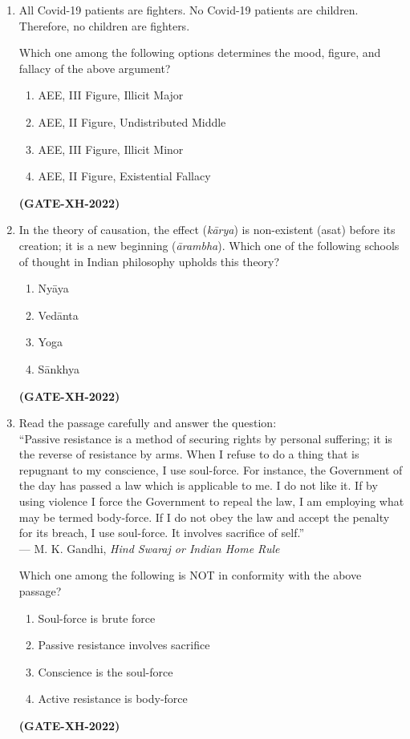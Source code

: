 \documentclass[journal]{IEEEtran}
\begin{document}
\begin{enumerate}
\item All Covid-19 patients are fighters. No Covid-19 patients are children. Therefore, no children are fighters.  

Which one among the following options determines the mood, figure, and fallacy of the above argument?  
\begin{multicols}{2}
\begin{enumerate}
\item AEE, III Figure, Illicit Major  
\item AEE, II Figure, Undistributed Middle  
\item AEE, III Figure, Illicit Minor  
\item AEE, II Figure, Existential Fallacy  
\end{enumerate}
\end{multicols}
\hfill\textbf{(GATE-XH-2022)}

\item In the theory of causation, the effect (\textit{kārya}) is non-existent (asat) before its creation; it is a new beginning (\textit{ārambha}). Which one of the following schools of thought in Indian philosophy upholds this theory?
\begin{multicols}{4}
\begin{enumerate}
\item Nyāya  
\item Vedānta  
\item Yoga  
\item Sānkhya  
\end{enumerate}
\end{multicols}
\hfill\textbf{(GATE-XH-2022)}

\item Read the passage carefully and answer the question:\\
“Passive resistance is a method of securing rights by personal suffering; it is the reverse of resistance by arms. When I refuse to do a thing that is repugnant to my conscience, I use soul-force. For instance, the Government of the day has passed a law which is applicable to me. I do not like it. If by using violence I force the Government to repeal the law, I am employing what may be termed body-force. If I do not obey the law and accept the penalty for its breach, I use soul-force. It involves sacrifice of self.”\\
\hfill --- M. K. Gandhi, \textit{Hind Swaraj or Indian Home Rule}

Which one among the following is NOT in conformity with the above passage?
\begin{multicols}{2}
\begin{enumerate}
\item Soul-force is brute force  
\item Passive resistance involves sacrifice  
\item Conscience is the soul-force  
\item Active resistance is body-force  
\end{enumerate}
\end{multicols}
\hfill\textbf{(GATE-XH-2022)}


\end{enumerate}
\end{document}
